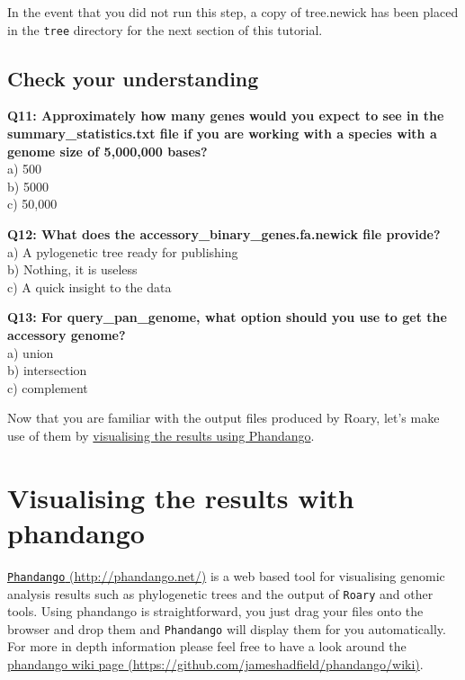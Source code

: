 \documentclass[11pt]{article}
\begin{document}
    In the event that you did not run this step, a copy of tree.newick has
been placed in the \texttt{tree} directory for the next section of this
tutorial.

\hypertarget{check-your-understanding}{%
\subsection{Check your understanding}\label{check-your-understanding}}

\textbf{Q11: Approximately how many genes would you expect to see in the
summary\_statistics.txt file if you are working with a species with a
genome size of 5,000,000 bases?}\\
a) 500\\
b) 5000\\
c) 50,000

\textbf{Q12: What does the accessory\_binary\_genes.fa.newick file
provide?}\\
a) A pylogenetic tree ready for publishing\\
b) Nothing, it is useless\\
c) A quick insight to the data

\textbf{Q13: For query\_pan\_genome, what option should you use to get
the accessory genome?}\\
a) union\\
b) intersection\\
c) complement

Now that you are familiar with the output files produced by Roary, let's
make use of them by \href{phandango.ipynb}{visualising the results using
Phandango}.





\newpage





    \hypertarget{visualising-the-results-with-phandango}{%
\section{Visualising the results with
phandango}\label{visualising-the-results-with-phandango}}

\href{http://phandango.net/}{\texttt{Phandango} (http://phandango.net/)}
is a web based tool for visualising genomic analysis results such as
phylogenetic trees and the output of \texttt{Roary} and other tools.
Using phandango is straightforward, you just drag your files onto the
browser and drop them and \texttt{Phandango} will display them for you
automatically. For more in depth information please feel free to have a
look around the
\href{https://github.com/jameshadfield/phandango/wiki}{phandango wiki
page (https://github.com/jameshadfield/phandango/wiki)}.
\end{document}

